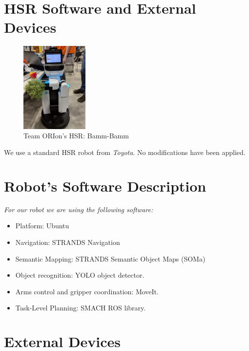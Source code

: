\section*{HSR Software and External Devices}
\label{sec:annex-DSPL}

\setlength\intextsep{0pt}
\begin{figure}
	\centering
	\includegraphics[width=0.3\textwidth]{images/hsr.jpg}
	\caption{Team ORIon's HSR: Bamm-Bamm}
	\label{fig:eva}
\end{figure}

We use a standard HSR robot from \textit{Toyota}. No modifications have been applied.

\section*{Robot's Software Description}

\textit{For our robot we are using the following software:}

\begin{itemize}
	\item Platform: Ubuntu
	\item Navigation: STRANDS Navigation
	\item Semantic Mapping: STRANDS Semantic Object Maps (SOMa)
	\item Object recognition: YOLO object detector.
	\item Arms control and gripper coordination:  MoveIt.
	\item Task-Level Planning: SMACH ROS library.
\end{itemize}

\section*{External Devices}

